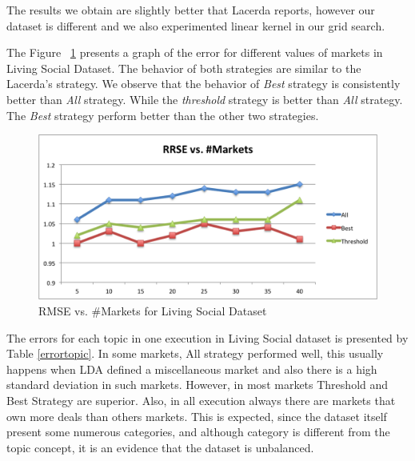 \documentclass{acm_proc_article-sp}
\begin{document}
The results we obtain are slightly better that Lacerda reports, 
however our dataset is different and we also experimented 
linear kernel in our grid search. 

The Figure ~\ref{rmsemarkets} presents a graph of the error 
for different values of markets in Living Social Dataset. The behavior of 
both strategies are similar to the Lacerda's strategy. We observe that 
the behavior of \emph{Best} strategy is consistently better 
than \emph{All} strategy. While the \emph{threshold} strategy is better 
than \emph{All} strategy. The \emph{Best} strategy perform better than 
the other two strategies.

\begin{figure}[H]
    \centering
    \includegraphics[scale=0.5]{rrsemarkets.png}
    \caption{RMSE vs. \#Markets for Living Social Dataset}
    \label{rmsemarkets}
\end{figure}


The errors for each topic in one execution  in Living Social dataset
is presented by Table \ref{errortopic}. In some markets, 
All strategy performed well, this usually happens when 
LDA defined a miscellaneous market and also there is a 
high standard deviation in such markets. However, 
in most markets Threshold and Best Strategy are superior.
Also, in all execution always there are markets that own 
more deals than others markets. This is expected, since 
the dataset itself present some numerous categories, and 
although category is different from the topic concept, 
it is an evidence that the dataset is unbalanced.
\end{document}
